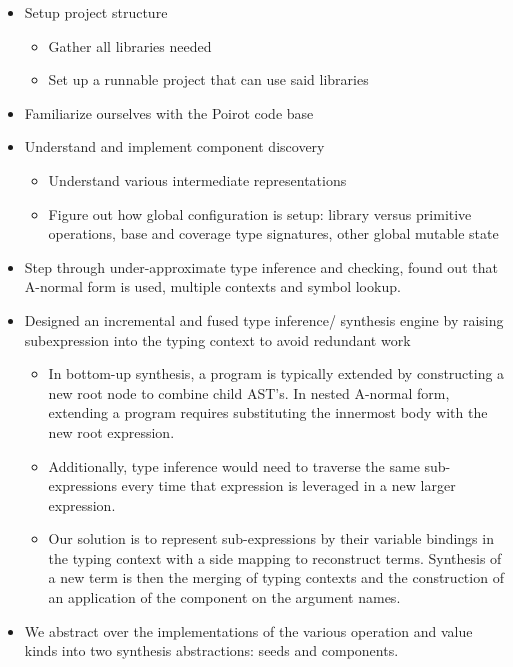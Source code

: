 \documentclass[review, sigplan]{acmart}
\begin{document}
\begin{itemize}
    \item Setup project structure
          \begin{itemize}
              \item Gather all libraries needed
              \item Set up a runnable project that can use said libraries
          \end{itemize}
    \item Familiarize ourselves with the Poirot code base
    \item Understand and implement component discovery
          \begin{itemize}
              \item Understand various intermediate representations
              \item Figure out how global configuration is setup: library versus primitive operations, base and coverage type
              signatures, other global mutable state
          \end{itemize}
    \item Step through under-approximate type inference and checking, found out that A-normal form is used, multiple contexts and symbol lookup.
    \item Designed an incremental and fused type inference/ synthesis engine by raising subexpression into the typing context to avoid redundant work
          \begin{itemize}
              \item In bottom-up synthesis, a program is typically extended by constructing a new root node to combine child AST's. In nested A-normal form, extending a program requires substituting the innermost body with the new root expression.
              \item Additionally, type inference would need to traverse the same sub-expressions every time that expression is leveraged in a new larger expression.
              \item Our solution is to represent sub-expressions by their variable bindings in the typing context with a side mapping to reconstruct terms. Synthesis of a new term is then the merging of typing contexts and the construction of an application of the component on the argument names.
          \end{itemize}
    \item We abstract over the implementations of the various operation and value kinds into two synthesis abstractions: seeds and components.

\end{itemize}
\end{document}
